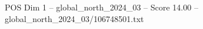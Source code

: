 \begin{textsample}{POS Dim 1 – global\_north\_2024\_03 – Score 14.00 – global\_north\_2024\_03/106748501.txt}
\end{textsample}
